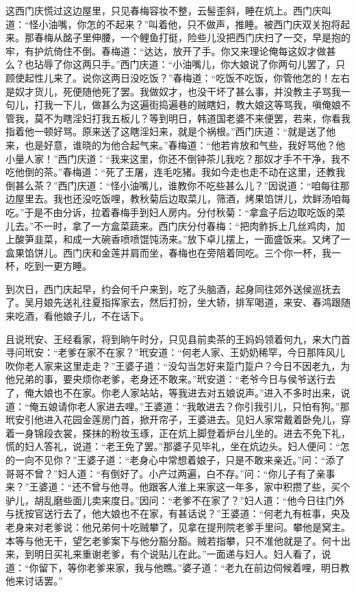 这西门庆慌过这边屋里，只见春梅容妆不整，云髻歪斜，睡在炕上。西门庆叫道：“怪小油嘴，你怎的不起来？”叫着他，只不做声，推睡。被西门庆双关抱将起来。那春梅从酩子里伸腰，一个鲤鱼打挺，险些儿没把西门庆扫了一交，早是抱的牢，有护炕倚住不倒。春梅道：“达达，放开了手。你又来理论俺每这奴才做甚么？也玷辱了你这两只手。”西门庆道：“小油嘴儿，你大娘说了你两句儿罢了，只顾使起性儿来了。说你这两日没吃饭？”春梅道：“吃饭不吃饭，你管他怎的！左右是奴才货儿，死便随他死了罢。我做奴才，也没干坏了甚么事，并没教主子骂我一句儿，打我一下儿，做甚么为这遍街捣遍巷的贼瞎妇，教大娘这等骂我，嗔俺娘不管我，莫不为瞎淫妇打我五板儿？等到明日，韩道国老婆不来便罢，若来，你看我指着他一顿好骂。原来送了这瞎淫妇来，就是个祸根。”西门庆道：“就是送了他来，也是好意，谁晓的为他合起气来。”春梅道：“他若肯放和气些，我好骂他？他小量人家！”西门庆道：“我来这里，你还不倒钟茶儿我吃？那奴才手不干净，我不吃他倒的茶。”春梅道：“死了王屠，连毛吃猪。我如今走也走不动在这里，还教我倒甚么茶？”西门庆道：“怪小油嘴儿，谁教你不吃些甚么儿？”因说道：“咱每往那边屋里去。我也还没吃饭哩，教秋菊后边取菜儿，筛酒，烤果馅饼儿，炊鲜汤咱每吃。”于是不由分诉，拉着春梅手到妇人房内。分付秋菊：“拿盒子后边取吃饭的菜儿去。”不一时，拿了一方盒菜蔬来。西门庆分付春梅：“把肉鲊拆上几丝鸡肉，加上酸笋韭菜，和成一大碗香喷喷馄饨汤来。”放下卓儿摆上，一面盛饭来。又烤了一盒果馅饼儿。西门庆和金莲并肩而坐，春梅也在旁陪着同吃。三个你一杯，我一杯，吃到一更方睡。

到次日，西门庆起早，约会何千户来到，吃了头脑酒，起身同往郊外送侯巡抚去了。吴月娘先送礼往夏指挥家去，然后打扮，坐大轿，排军喝道，来安、春鸿跟随来吃酒，看他娘子儿，不在话下。

且说玳安、王经看家，将到晌午时分，只见县前卖茶的王妈妈领着何九，来大门首寻问玳安：“老爹在家不在家？”玳安道：“何老人家、王奶奶稀罕，今日那阵风儿吹你老人家来这里走走？”王婆子道：“没勾当怎好来踅门踅户？今日不因老九，为他兄弟的事，要央烦你老爹，老身还不敢来。”玳安道：“老爷今日与侯爷送行去了，俺大娘也不在家。你老人家站站，等我进去对五娘说声。”进入不多时出来，说道：“俺五娘请你老人家进去哩。”王婆道：“我敢进去？你引我引儿，只怕有狗。”那玳安引他进入花园金莲房门首，掀开帘子，王婆进去。见妇人家常戴着卧免儿，穿着一身锦段衣裳，搽抹的粉妆玉琢，正在炕上脚登着炉台儿坐的。进去不免下礼，慌的妇人答礼，说道：“老王免了罢。”那婆子见毕礼，坐在炕边头。妇人便问：“怎的一向不见你？”王婆子道：“老身心中常想着娘子，只是不敢来亲近。”问：“添了哥哥不曾？”妇人道：“有倒好了。小产过两遍，白不存。”问：“你儿子有了亲事来？”王婆道：“还不曾与他寻。他跟客人淮上来家这一年多，家中积攒了些，买个驴儿，胡乱磨些面儿卖来度日。”因问：“老爹不在家了？”妇人道：“他今日往门外与抚按官送行去了，他大娘也不在家，有甚话说？”王婆道：“何老九有桩事，央及老身来对老爹说：他兄弟何十吃贼攀了，见拿在提刑院老爹手里问。攀他是窝主。本等与他无干，望乞老爹案下与他分豁分豁。贼若指攀，只不准他就是了。何十出来，到明日买礼来重谢老爹，有个说贴儿在此。”一面递与妇人。妇人看了，说道：“你留下，等你老爹来家，我与他瞧。”婆子道：“老九在前边伺候着哩，明日教他来讨话罢。”

